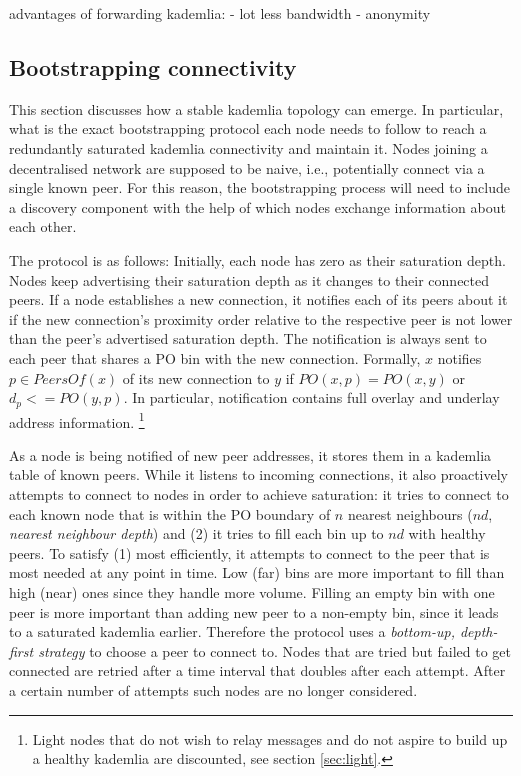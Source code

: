 \documentclass[a4paper,10pt,fullpage]{article}
\numberwithin{equation}{section}
\newcommand\gloss[1]{\emph{\gls{#1}}}
\theoremstyle{definition}
\begin{document}
advantages of forwarding kademlia:
- lot less bandwidth
- anonymity 

\subsection{Bootstrapping connectivity}
\label{sec:bootstrapping} 

This  section discusses how a stable kademlia topology  can emerge. 
In particular, what is the exact bootstrapping protocol each node  needs to follow to reach a redundantly saturated kademlia connectivity and maintain it. Nodes joining a decentralised network  are supposed to be  naive, i.e., potentially connect via a single known peer. For this reason, the bootstrapping process  will need to include a discovery component with the help of which nodes exchange information about each other.  

The protocol is as follows:
Initially, each node has zero as their saturation depth. Nodes keep advertising their saturation depth as it changes to their connected peers. If a node establishes a new connection, it notifies each of its peers about it if the new connection's proximity order relative to the respective peer is not lower than the peer's advertised saturation depth. The notification is always sent to each peer that shares a PO bin with the new connection.  Formally, $x$ notifies $p\in\mathit{PeersOf}(x)$ of its new connection to $y$ if $\mathit{PO}(x, p) = \mathit{PO}(x, y)$ or $d_p <= \mathit{PO}(y, p)$. In particular, notification contains  full overlay and underlay address information.%
%
\footnote{Light nodes that do not wish to relay messages and do not aspire to build up a healthy  kademlia are discounted, see section \ref{sec:light}. }

As a node is being notified of new peer addresses, it stores them in  a kademlia table of known peers. 
While it listens to incoming connections, it also proactively attempts to connect to nodes in order to achieve saturation: it tries to connect to each known node that is within the PO boundary of $n$ nearest neighbours ($nd$, \gloss{nearest neighbour depth}) and (2) it tries to fill each bin up to $nd$ with healthy peers. To satisfy (1) most efficiently, it attempts to connect to the peer that is most needed at any point in time. Low (far) bins are more important to fill than high (near) ones since they handle more volume. Filling an empty bin with one peer is more important than adding new peer to a non-empty bin, since it leads to a saturated kademlia earlier. Therefore the protocol uses a \emph{bottom-up, depth-first strategy} to choose a peer to connect to.  Nodes that are tried but failed to get connected are retried after a time interval that doubles after each attempt. After a certain number of attempts such nodes are no longer considered.
\end{document}
